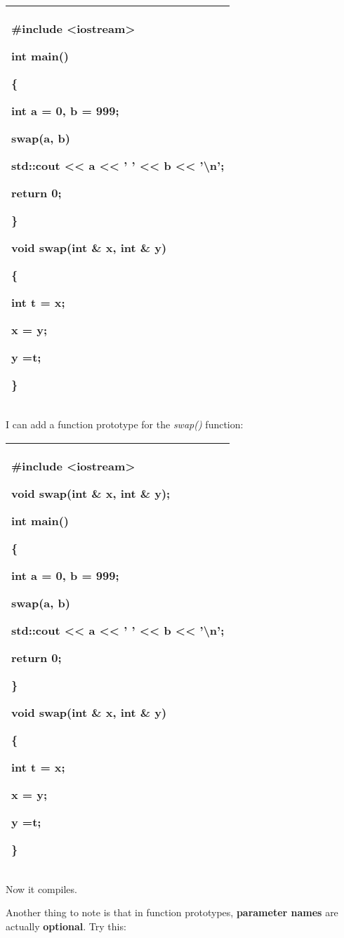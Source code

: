 \documentclass[
]{article}
\begin{document}
\begin{longtable}[]{@{}l@{}}
\toprule
\endhead
\begin{minipage}[t]{0.97\columnwidth}\raggedright
\#include \textless iostream\textgreater{}

int main()

\{

int a = 0, b = 999;

swap(a, b)

std::cout \textless\textless{} a \textless\textless{} ' '
\textless\textless{} b \textless\textless{} '\textbackslash n';

return 0;

\}

void swap(int \& x, int \& y)

\{

int t = x;

x = y;

y =t;

\}\strut
\end{minipage}\tabularnewline
\bottomrule
\end{longtable}

I can add a function prototype for the \emph{swap()} function:

\begin{longtable}[]{@{}l@{}}
\toprule
\endhead
\begin{minipage}[t]{0.97\columnwidth}\raggedright
\#include \textless iostream\textgreater{}

void swap(int \& x, int \& y);

int main()

\{

int a = 0, b = 999;

swap(a, b)

std::cout \textless\textless{} a \textless\textless{} ' '
\textless\textless{} b \textless\textless{} '\textbackslash n';

return 0;

\}

void swap(int \& x, int \& y)

\{

int t = x;

x = y;

y =t;

\}\strut
\end{minipage}\tabularnewline
\bottomrule
\end{longtable}

Now it compiles.

Another thing to note is that in function prototypes, \textbf{parameter
names} are actually \textbf{optional}. Try this:
\end{document}
